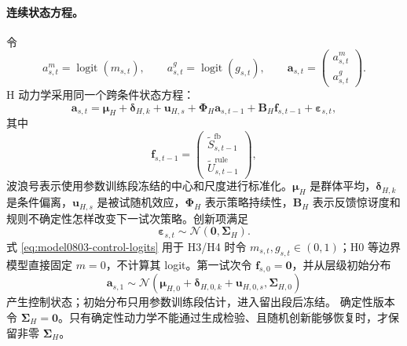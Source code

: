 \paragraph{连续状态方程。}
令
\begin{equation}
    a^m_{s,t}=\operatorname{logit}(m_{s,t}),
    \qquad
    a^g_{s,t}=\operatorname{logit}(g_{s,t}),
    \qquad
    \mathbf a_{s,t}=
    \begin{pmatrix}a^m_{s,t}\\a^g_{s,t}\end{pmatrix}.
    \label{eq:model0803-control-logits}
\end{equation}
H 动力学采用同一个跨条件状态方程：
\begin{equation}
    \mathbf a_{s,t}
    =\boldsymbol\mu_H
     +\boldsymbol\delta_{H,k}
     +\mathbf u_{H,s}
     +\boldsymbol\Phi_H\mathbf a_{s,t-1}
     +\mathbf B_H\mathbf f_{s,t-1}
     +\boldsymbol\varepsilon_{s,t},
    \label{eq:model0803-h-dynamics}
\end{equation}
其中
\begin{equation}
    \mathbf f_{s,t-1}
    =
    \begin{pmatrix}
      \widetilde S^{\mathrm{fb}}_{s,t-1}\\
      \widetilde U^{\mathrm{rule}}_{s,t-1}
    \end{pmatrix},
    \label{eq:model0803-dynamic-inputs}
\end{equation}
波浪号表示使用参数训练段冻结的中心和尺度进行标准化。$\boldsymbol\mu_H$ 是群体平均，$\boldsymbol\delta_{H,k}$ 是条件偏离，$\mathbf u_{H,s}$ 是被试随机效应，$\boldsymbol\Phi_H$ 表示策略持续性，$\mathbf B_H$ 表示反馈惊讶度和规则不确定性怎样改变下一试次策略。创新项满足
\begin{equation}
    \boldsymbol\varepsilon_{s,t}
    \sim\mathcal N(\mathbf0,\boldsymbol\Sigma_H).
    \label{eq:model0803-h-innovation}
\end{equation}
式 \ref{eq:model0803-control-logits} 用于 H3/H4 时令 $m_{s,t},g_{s,t}\in(0,1)$；H0 等边界模型直接固定 $m=0$，不计算其 logit。第一试次令 $\mathbf f_{s,0}=\mathbf0$，并从层级初始分布
\begin{equation}
    \mathbf a_{s,1}
    \sim\mathcal N\!\left(
      \boldsymbol\mu_{H,0}
      +\boldsymbol\delta_{H,0,k}
      +\mathbf u_{H,0,s},
      \boldsymbol\Sigma_{H,0}
    \right)
    \label{eq:model0803-h-initial}
\end{equation}
产生控制状态；初始分布只用参数训练段估计，进入留出段后冻结。
确定性版本令 $\boldsymbol\Sigma_H=\mathbf0$。只有确定性动力学不能通过生成检验、且随机创新能够恢复时，才保留非零 $\boldsymbol\Sigma_H$。

